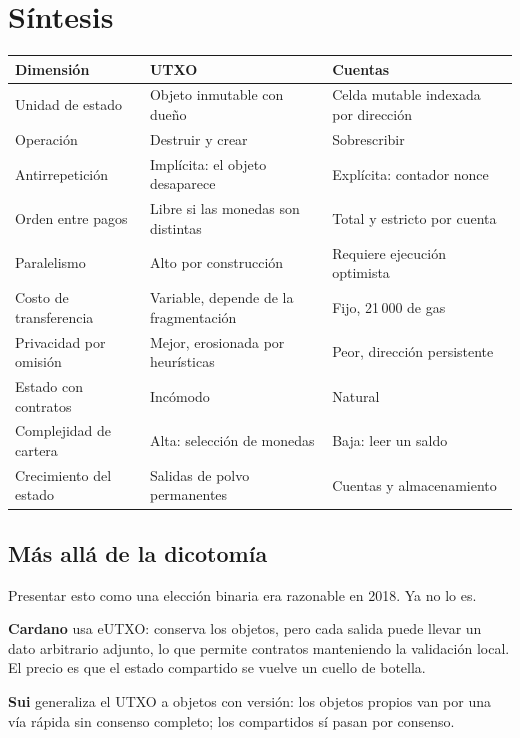 \documentclass[11pt,a4paper]{article}
\theoremstyle{definition}
\theoremstyle{plain}
\theoremstyle{remark}
\begin{document}
\section{Síntesis}\label{sec:sintesis}

\begin{center}
\small
\begin{tabularx}{\textwidth}{@{}lXX@{}}
\toprule
Dimensión & UTXO & Cuentas \\
\midrule
Unidad de estado & Objeto inmutable con dueño & Celda mutable indexada por dirección \\
Operación & Destruir y crear & Sobrescribir \\
Antirrepetición & Implícita: el objeto desaparece & Explícita: contador nonce \\
Orden entre pagos & Libre si las monedas son distintas & Total y estricto por cuenta \\
Paralelismo & Alto por construcción & Requiere ejecución optimista \\
Costo de transferencia & Variable, depende de la fragmentación & Fijo, 21\,000 de gas \\
Privacidad por omisión & Mejor, erosionada por heurísticas & Peor, dirección persistente \\
Estado con contratos & Incómodo & Natural \\
Complejidad de cartera & Alta: selección de monedas & Baja: leer un saldo \\
Crecimiento del estado & Salidas de polvo permanentes & Cuentas y almacenamiento \\
\bottomrule
\end{tabularx}
\end{center}

\subsection{Más allá de la dicotomía}

Presentar esto como una elección binaria era razonable en 2018. Ya no lo es.

\textbf{Cardano} usa eUTXO: conserva los objetos, pero cada salida puede llevar
un dato arbitrario adjunto, lo que permite contratos manteniendo la validación
local. El precio es que el estado compartido se vuelve un cuello de botella.

\textbf{Sui} generaliza el UTXO a objetos con versión: los objetos propios van
por una vía rápida sin consenso completo; los compartidos sí pasan por consenso.
\end{document}
